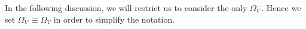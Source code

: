 \begin{rem}
	In the following discussion, we will restrict us to consider the only $\Omega_V^-$. Hence we set $\Omega_V^-\equiv\Omega_V$ in order to simplify the notation.
\end{rem}


 
